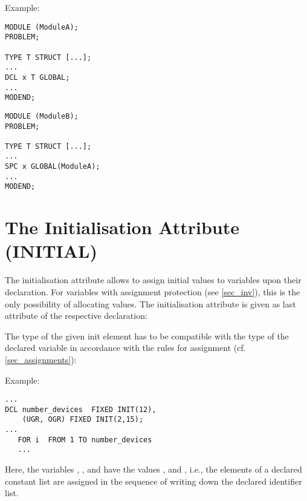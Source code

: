 \begin{minipage}{\linewidth}
Example:
\begin{multicols}{2}
\begin{lstlisting}
MODULE (ModuleA);
PROBLEM;   
             
TYPE T STRUCT [...];
...                
DCL x T GLOBAL;   
...           
MODEND;     
\end{lstlisting}
\columnbreak
\begin{lstlisting}
MODULE (ModuleB);
PROBLEM;        
           
TYPE T STRUCT [...];
...               
SPC x GLOBAL(ModuleA);
...                
MODEND;     
\end{lstlisting}
\end{multicols}
\end{minipage}



\section{The Initialisation Attribute (INITIAL)}   %
\label{sec_init}

The initialisation attribute allows to assign initial values to
variables upon their declaration. For variables with assignment
protection (see \ref{sec_inv}), this is the only possibility of allocating
values. The initialisation attribute is given as last attribute of the
respective declaration:

\begin{grammarframe}



\end{grammarframe}

The type of the given init element has to be compatible with the type of
the declared variable in accordance with the rules for assignment (cf.
\ref{sec_assignments}):

Example:

\begin{lstlisting}
...
DCL number_devices  FIXED INIT(12),
    (UGR, OGR) FIXED INIT(2,15);
...
   FOR i  FROM 1 TO number_devices
   ...
\end{lstlisting}

Here, the variables , , and 
 have the values ,  and ,
 i.e., the elements of a declared constant list are assigned in
the sequence of writing down the declared identifier list.

